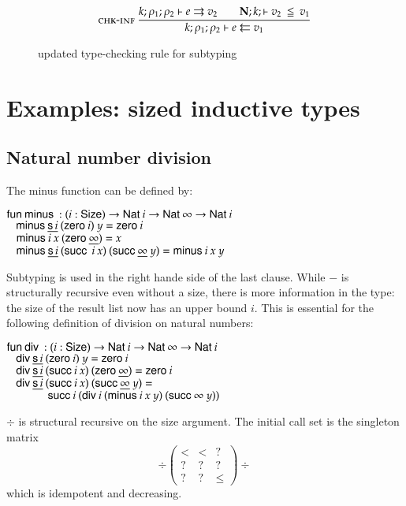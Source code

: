 \begin{figure}[htp]

\begin{gather*}
\mbox{\sc chk-inf}\ \dfrac{k;\rho_1;\rho_2\vdash e\rightrightarrows v_2
\qquad
{\mathbf{N};k;\vdash v_2\:\leqq\:v_1}}{k;\rho_1;\rho_2\vdash e\leftleftarrows v_1}
\end{gather*}
\caption{updated type-checking rule for subtyping}
\label{fnews}
\end{figure}

\section{Examples: sized inductive types }

\subsection{Natural number division}

The minus function can be defined by:
\begin{bsp}
$\mathsf{fun}\: \mathsf{minus}\: : (i : \mathsf{Size} ) \rightarrow \mathsf{Nat}\: i \rightarrow \mathsf{Nat}\: \infty \rightarrow \mathsf{Nat}\: i$\\
$\hspace*{3mm} \mathsf{minus}\: \underline{\mathsf{s}\, i} \: (\mathsf{zero}\: i) \:  y = \mathsf{zero}\: i $ \\
$\hspace*{3mm} \mathsf{minus}\: i \: x \: (\mathsf{zero}\: \underline{\infty})  = x $\\
$\hspace*{3mm} \mathsf{minus}\: \underline{\mathsf{s}\, i} \: (\mathsf{succ}\: \: i \: x) \: (\mathsf{succ}\: \underline{\infty} \: y) = \mathsf{minus}\: i \: x \: y $
\end{bsp}
Subtyping is used in the right hande side of the last clause.
While $\minus$ is structurally recursive even without a size, 
there is more information in the type: the size of the result list now has an upper bound $i$.
This is essential for the following definition of division on natural numbers:
\begin{bsp}
$\mathsf{fun}\: \mathsf{div}\: : ( i : \mathsf{Size} )  \rightarrow  \mathsf{Nat}\: i \rightarrow \mathsf{Nat}\: \infty \rightarrow \mathsf{Nat}\: i$\\
$\hspace*{3mm} \mathsf{div}\: \underline{\mathsf{s}\, i} \: (\mathsf{zero}\: i) \: y = \mathsf{zero}\: i$\\
$\hspace*{3mm} \mathsf{div}\: \underline{\mathsf{s}\, i} \: (\mathsf{succ}\: i \: x) \: (\mathsf{zero}\: \underline{\infty})  = \mathsf{zero}\: i$\\
$\hspace*{3mm} \mathsf{div}\: \underline{\mathsf{s}\, i} \: (\mathsf{succ}\: i \: x) \: (\mathsf{succ}\: \underline{\infty} \: y) = $\\
$\spc \spcx \suc i \: (\div i \: (\minus i \: x \:y) \: (\suc \infty \: y))$
\end{bsp}
$\div$ is structural recursive on the size argument.
The initial call set is the singleton matrix
\[
\div
\begin{pmatrix}
<    &  <  & ? \\
?    &  ?  &  ? \\
?    &  ?  & \leq 
\end{pmatrix}\div
\] 
which is idempotent and decreasing.

